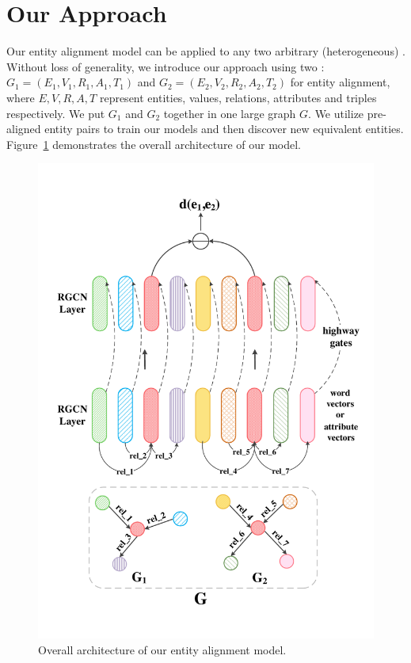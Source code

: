 
		\section{Our Approach}
	\label{section:app}
	Our entity alignment model can be applied to any two arbitrary (heterogeneous) \KGs. Without loss of generality, we introduce our approach using two \KGs: $G_1 = (E_1,V_1,R_1,A_1,T_1)$ and $G_2 = (E_2,V_2,R_2,A_2,T_2)$ for entity alignment, where
$E,V,R,A,T$ represent entities, values, relations, attributes and triples respectively.
	We put $G_1$ and $G_2$ together in one large graph $G$. We utilize pre-aligned entity pairs to train our models and then discover new
equivalent entities. Figure~\ref{all} demonstrates the overall architecture of our model.
	
	
	\begin{figure}[t!]
		\begin{center}
			\includegraphics[width=1\linewidth]{figures/graph2.pdf}
			\caption{Overall architecture of our entity alignment model.}
			\label{all}
		\end{center}
	\end{figure}
	
